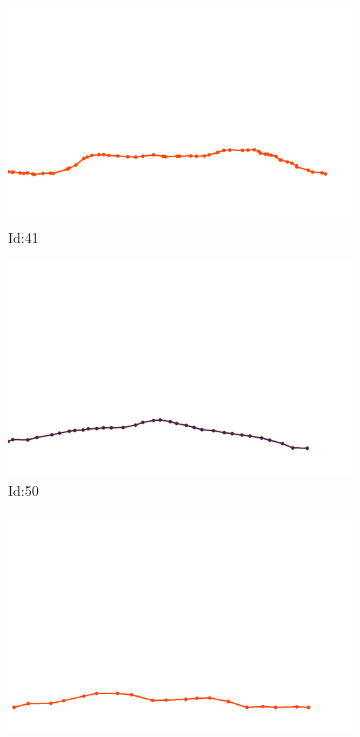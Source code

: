 \documentclass[12pt,twoside]{report}
\begin{document}
\begin{figure}
\centering
\begin{subfigure}[b]{0.20\textwidth}
\centering
\includegraphics[width=\textwidth]{../trajectories/41.png}
\caption{Id:41}
\end{subfigure}
\begin{subfigure}[b]{0.20\textwidth}
\centering
\includegraphics[width=\textwidth]{../trajectories/50.png}
\caption{Id:50}
\end{subfigure}
\begin{subfigure}[b]{0.20\textwidth}
\centering
\includegraphics[width=\textwidth]{../trajectories/97.png}

\end{subfigure}
\end{figure}
\end{document}
